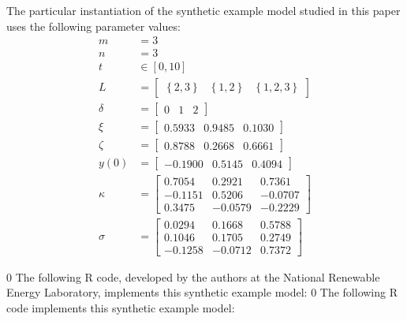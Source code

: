 \documentclass[12pt]{article}
\newcommand{\blind}{0}
\begin{document}
The particular instantiation of the synthetic example model studied in this paper uses the following parameter values:
\begin{align*}
    m & = 3
    \\
    n & = 3
    \\
    t & \in [0, 10]
    \\
    L & = \begin{bmatrix} \left\{ 2, 3 \right\} & \left\{ 1, 2 \right\} & \left\{ 1, 2, 3 \right\} \end{bmatrix}
    \\
    \delta & = \begin{bmatrix} 0 & 1 & 2 \end{bmatrix}
    \\
    \xi & = \begin{bmatrix} 0.5933 & 0.9485 & 0.1030 \end{bmatrix}
    \\
    \zeta & = \begin{bmatrix} 0.8788 & 0.2668 & 0.6661 \end{bmatrix}
    \\
    y(0) & = \begin{bmatrix} -0.1900 & 0.5145 & 0.4094 \end{bmatrix}
    \\
    \kappa & = \begin{bmatrix} 0.7054 & 0.2921 & 0.7361 \\ -0.1151 & 0.5206 & -0.0707 \\ 0.3475 & -0.0579 & -0.2229 \end{bmatrix}
    \\
    \sigma & = \begin{bmatrix} 0.0294 & 0.1668 & 0.5788 \\ 0.1046 & 0.1705 & 0.2749 \\ -0.1258 & -0.0712 & 0.7372 \end{bmatrix}
\end{align*}

\blind {
The following R code, developed by the authors at the National Renewable Energy Laboratory, implements this synthetic example model:
} \fi
{}\blind {
The following R code implements this synthetic example model:
} \fi
\end{document}
